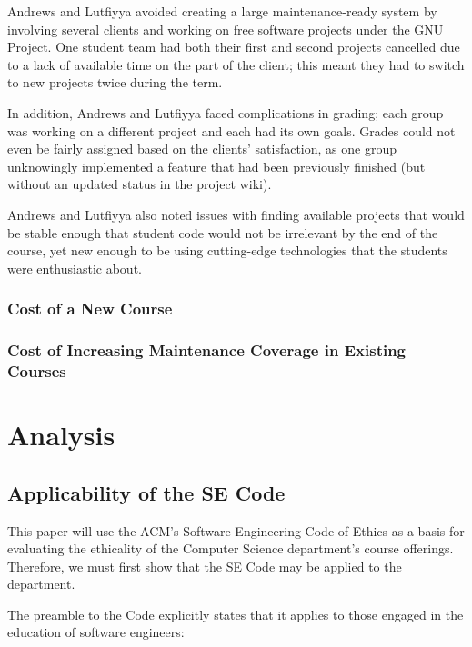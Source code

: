 \documentclass[11pt]{article}
\begin{document}
\begin{multicols}{2}
Andrews and Lutfiyya avoided creating a large maintenance-ready system by involving several clients and working on free software projects under the GNU Project.  One student team had both their first and second projects cancelled due to a lack of available time on the part of the client; this meant they had to switch to new projects twice during the term. \cite{andrews}

In addition, Andrews and Lutfiyya faced complications in grading; each group was working on a different project and each had its own goals. \cite{andrews}  Grades could not even be fairly assigned based on the clients' satisfaction, as one group unknowingly implemented a feature that had been previously finished (but without an updated status in the project wiki). \cite{andrews}

Andrews and Lutfiyya also noted issues with finding available projects that would be stable enough that student code would not be irrelevant by the end of the course, yet new enough to be using cutting-edge technologies that the students were enthusiastic about. \cite{andrews}


\subsubsection{Cost of a New Course}

\subsubsection{Cost of Increasing Maintenance Coverage in Existing Courses}

\section{Analysis}

\subsection{Applicability of the SE Code}

This paper will use the ACM's Software Engineering Code of Ethics as a basis for evaluating the ethicality of the Computer Science department's course offerings.  Therefore, we must first show that the SE Code may be applied to the department.

The preamble to the Code explicitly states that it applies to those engaged in the education of software engineers:


\end{multicols}
\end{document}
